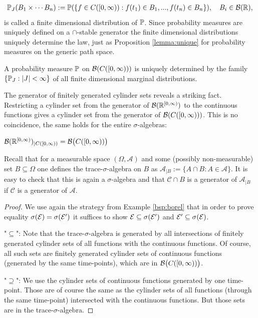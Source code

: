 \begin{align*}
	\P_J(B_1\times \cdots B_{n}):= \P(\{f\in C([0,\infty)): f(t_1)\in B_1,... ,f(t_n)\in B_n\}),\quad B_i\in \mathcal B(\R),
\end{align*}
is called a finite dimensional distribution of $\P$. Since probability measures are uniquely defined on a $\cap$-stable generator the finite dimensional distributions uniquely determine the law, just as Proposition \ref{lemma:unique} for probability measures on the generic path space.
\begin{llemma}
\begin{prop}
	A probability measure $\P$ on $\cB( C([0,\infty)))$ is uniquely determined by the family $\{\P_J: |J|<\infty\}$ of all finite dimensional marginal distributions.
\end{prop}
\end{llemma}
The generator of finitely generated cylinder sets reveals a striking fact. Restricting a cylinder set from the generator of $\mathcal B(\R^{[0,\infty)})$ to the continuous functions gives a cylinder set from the generator of $\cB( C([0,\infty)))$. This is no coincidence, the same holds for the entire $\sigma$-algebras:
\begin{llemma}
\begin{prop}
	$\mathcal B(\R^{[0,\infty)})_{|C([0,\infty))}=\cB \big( C([0,\infty))\big)$
\end{prop}
\end{llemma}
Recall that for a measurable space $(\Omega, \mathcal A)$ and some (possibly non-measurable) set $B\subseteq \Omega$ one defines the trace-$\sigma$-algebra on $B$ as $\mathcal A_{|B}:=\{A\cap B: A\in \mathcal A\}$. It is easy to check that this is again a $\sigma$-algebra and that $\mathcal C\cap B$ is a generator of $\mathcal A_{|B}$ if $\mathcal C$ is a generator of $\mathcal A$.
\begin{proof}[Proof]
	We use again the strategy from Example \ref{bsp:borel} that in order to prove equality $\sigma(\cE)=\sigma(\cE')$ it suffices to show $\cE\subseteq \sigma(\cE')$ and $\cE'\subseteq \sigma(\cE)$.\smallskip

	"{}$\subseteq$"{}: Note that the trace-$\sigma$-algebra is generated by all intersections of finitely generated cylinder sets of all functions with the continuous functions. Of course, all such sets are finitely generated cylinder sets of continuous functions (generated by the same time-points), which are in $\cB \big( C([0,\infty))\big)$.\smallskip

	"{}$\supseteq$"{}: We use the cylinder sets of continuous functions generated by one time-point. Those are of course the same as the cylinder sets of all functions (through the same time-point) intersected with the continuous functions. But those sets are in the trace-$\sigma$-algebra.
\end{proof}
